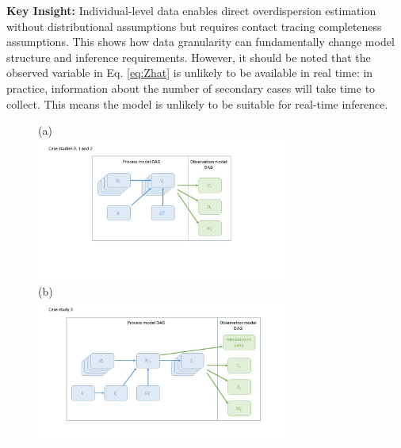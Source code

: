 \documentclass{article}
\begin{document}
\textbf{Key Insight:} Individual-level data enables direct overdispersion estimation without distributional assumptions but requires contact tracing completeness assumptions. This shows how data granularity can fundamentally change model structure and inference requirements. However, it should be noted that the observed variable in Eq. \eqref{eq:Zhat} is unlikely to be available in real time: in practice, information about the number of secondary cases will take time to collect. This means the model is unlikely to be suitable for real-time inference. 

\begin{figure}
\centering
(a) \\
\includegraphics[width=0.75\textwidth]{figures/case_study_0_1_2.jpg}\\
(b)\\
\includegraphics[width=0.75\textwidth]{figures/case_study_3.jpg}
\label{fig:CS3_DAG}

\end{figure}
\end{document}
